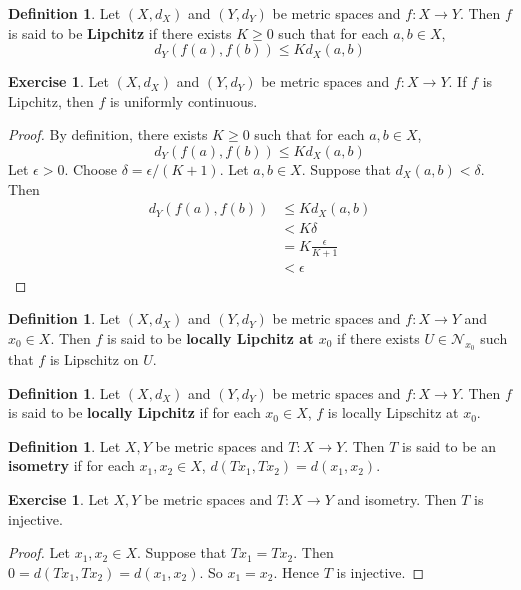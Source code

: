 \documentclass[12pt]{amsart}
\theoremstyle{definition}
\newtheorem{defn}[definition]{Definition}
\newtheorem{ex}[definition]{Exercise}
\newcommand{\del}{\delta}
\newcommand{\ep}{\epsilon}
\newcommand{\MN}{\mathcal{N}}
\newcommand{\lex}[1]{\label{ex:#1}}
\newcommand{\ld}[1]{\label{defn:#1}}
\begin{document}
	\begin{defn} \ld{}
	Let $(X, d_X)$ and $(Y, d_Y)$ be metric spaces and $f: X \rightarrow Y$. Then $f$ is said to be \textbf{Lipchitz} if there exists $K \geq 0$ such that for each $a, b \in X$, $$d_Y(f(a), f(b)) \leq Kd_X(a,b)$$
	\end{defn}	
	
	\begin{ex} \lex{}
	Let $(X, d_X)$ and $(Y, d_Y)$ be metric spaces and $f: X \rightarrow Y$. If $f$ is Lipchitz, then $f$ is uniformly continuous.	
	\end{ex}
	
	\begin{proof}
	By definition, there exists $K \geq 0$ such that for each $a, b \in X$, $$d_Y(f(a), f(b)) \leq Kd_X(a,b)$$ Let $\ep >0$. Choose $\del = \ep / (K+1)$. Let $a, b \in X$. Suppose that $d_X(a,b) < \del$. Then 
	\begin{align*}
	d_Y(f(a), f(b)) 
	& \leq Kd_X(a,b) \\
	& < K \del \\
	&= K \frac{\ep}{K+1} \\
	&< \ep  
	\end{align*}
	\end{proof}
	
	\begin{defn} \ld{}
	Let $(X, d_X)$ and $(Y, d_Y)$ be metric spaces and $f: X \rightarrow Y$ and $x_0 \in X$. Then $f$ is said to be \textbf{locally Lipchitz at $x_0$} if there exists $U \in \MN_{x_0}$ such that $f$ is Lipschitz on $U$.
	\end{defn}
	
	\begin{defn} \ld{}
	Let $(X, d_X)$ and $(Y, d_Y)$ be metric spaces and $f: X \rightarrow Y$. Then $f$ is said to be \textbf{locally Lipchitz} if for each $x_0 \in X$, $f$ is locally Lipschitz at $x_0$.
	\end{defn}
	
	
	\begin{defn} \ld{}
		Let $X, Y$ be metric spaces and $T : X \rightarrow Y$. Then $T$ is said to be an \textbf{isometry} if for each $x_1, x_2 \in X$, $d( Tx_1, Tx_2) = d(x_1,x_2) $.
	\end{defn}
	
	\begin{ex} \lex{}
		Let $X,Y$ be metric spaces and $T:X \rightarrow Y$ and isometry. Then $T$ is injective.
	\end{ex}
	
	\begin{proof}
		Let $x_1, x_2 \in X$. Suppose that $Tx_1=Tx_2$. Then $0= d( Tx_1, Tx_2) = d(x_1,x_2)$. So $x_1 = x_2$. Hence $T$ is injective.
	\end{proof}
	
\end{document}
